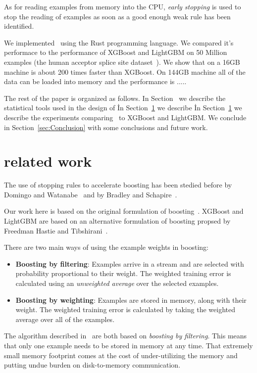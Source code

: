 As for reading examples from memory into the CPU, {\em early stopping}
is used to stop the reading of examples as soon as a good enough weak
rule has been identified.

We implemented \Sparrow\ using the Rust programming language. We
compared it's performace to the performance of XGBoost and LightGBM on
50 Million examples (the human acceptor splice site
dataset~\cite{sonnenburg_coffin:_2010, agarwal_reliable_2014}). We
show that on a 16GB machine \Sparrow is about 200 times faster than
XGBoost. On 144GB machine all of the data can be loaded into memory
and the performance is .....

The rest of the paper is organized as follows. In Section~\cite{} we
describe the statistical tools used in the design of \Sparrow\. In
Section~\ref{} we describe \Sparrow\. In Section~\ref{} we describe
the experiments comparing \Sparrow\ to XGBoost and LightGBM. We
conclude in Section~\ref{sec:Conclusion} with some conclusions and
future work.

\section{related work}

The use of stopping rules to accelerate boosting has been stedied 
before by Domingo and Watanabe~\cite{domingo_scaling_2000} and by
Bradley and Schapire~\cite{bradley_filterboost:_2007}.

Our work here is based on the original formulation of
boosting~\cite{original, confidence-rated-boosting, adtrees, Book}.
XGBoost and LightGBM are based on an alternative formulation of
boosting propsed by Freedman Hastie and Tibshirani~\cite{}.

\iffalse

There are two main ways of using the example weights in boosting:
\begin{itemize}
\item {\bf Boosting by filtering}: Examples arrive in a stream and are
  selected with probability proportional to their weight. The weighted
  training error is calculated using an {\em unweighted average} over
  the selected examples.
\item {\bf Boosting by weighting}: Examples are stored in memory,
  along with their weight. The weighted training error is calculated
  by taking the weighted average over all of the examples.
\end{itemize}
The algorithm described
in~\cite{domingo_scaling_2000,bradley_filterboost:_2007} are both
based on {\em boosting by filtering}. This means that only one example
needs to be stored in memory at any time. That extremely small memory
footprint comes at the cost of under-utilizing the memory and putting
undue burden on disk-to-memory communication.

